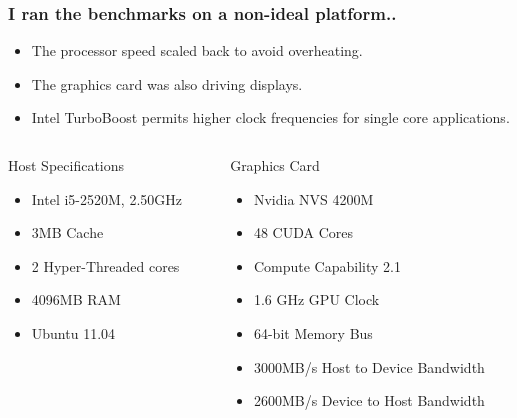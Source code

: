 \documentclass{beamer}
\begin{document}
    \begin{frame}
        \frametitle{I ran the benchmarks on a non-ideal platform..}
        \begin{itemize}
            \item The processor speed scaled back to avoid overheating.
            \item The graphics card was also driving displays.
            \item Intel TurboBoost permits higher clock frequencies for single core applications.
        \end{itemize}

         \begin{columns}[t]
            \begin{column}[t]{.5\linewidth}
            \begin{block}{Host Specifications}
            \begin{itemize}
                \item Intel i5-2520M, 2.50GHz
                \item 3MB Cache
                \item 2 Hyper-Threaded cores
                \item 4096MB RAM
                \item Ubuntu 11.04
            \end{itemize}
            \end{block}
            \end{column}
            
            \begin{column}[t]{.5\linewidth}
            \begin{block}{Graphics Card}
            \begin{itemize}
                \item Nvidia NVS 4200M  
                \item 48 CUDA Cores
                \item Compute Capability 2.1
                \item 1.6 GHz GPU Clock
                \item 64-bit  Memory Bus
                \item 3000MB/s Host to Device Bandwidth 
                \item 2600MB/s Device to Host Bandwidth
            \end{itemize}
            \end{block}
            \end{column}
        \end{columns}
     

    \end{frame}
\end{document}
